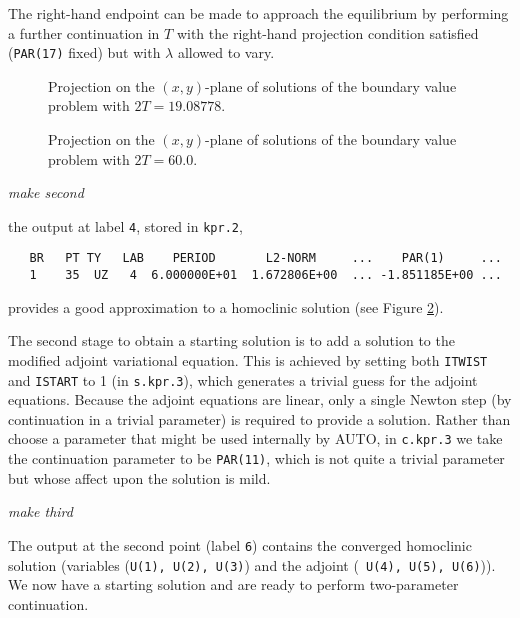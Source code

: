 \documentclass[12pt]{report}
\begin{document}
The right-hand endpoint can be made to approach the
equilibrium by performing a further continuation in $T$ with the
right-hand projection condition satisfied ({\tt PAR(17)} fixed) but
with $\lambda$ allowed to vary. 
%
\begin{figure}[p]
\epsfysize 9.0cm
\centerline{}
\caption{Projection on the $(x,y)$-plane of solutions 
of the boundary value 
problem with $2T=19.08778$.}
\label{kf.1a}
\end{figure}
\begin{figure}[p]
\epsfysize 9.0cm
\centerline{}
\caption{Projection on the $(x,y)$-plane of solutions of the 
boundary value problem with $2T = 60.0$.}
\label{kf.1b}
\end{figure}
%
\begin{center}
{\it make second}
\end{center}
the output at label {\tt 4}, stored in {\tt kpr.2},
\begin{verbatim}
   BR   PT TY   LAB    PERIOD       L2-NORM     ...    PAR(1)     ...
   1    35  UZ   4  6.000000E+01  1.672806E+00  ... -1.851185E+00 ...
\end{verbatim}
provides a good approximation to a homoclinic solution (see Figure
\ref{kf.1b}). 

The second stage to obtain a starting solution 
is to add a solution to the modified adjoint
variational equation. This is achieved by setting both 
{\tt ITWIST} and {\tt ISTART} to 1 (in {\tt s.kpr.3}), which generates
a trivial guess for the adjoint equations. Because the adjoint
equations are linear, only a single
Newton step (by continuation in a trivial parameter) 
is required to provide a solution.
Rather than choose a parameter that might be used internally
by {\cal AUTO}, in {\tt c.kpr.3} we take the continuation parameter
to be {\tt PAR(11)}, which is not quite a trivial parameter
but whose affect upon the solution is mild.
\begin{center}
{\it make third}
\end{center}
The output at the second point (label {\tt 6}) 
contains the converged homoclinic
solution (variables ({\tt U(1), U(2), U(3)}) and the adjoint ({\tt
U(4), U(5), U(6)})). We now have a starting solution 
and are ready to perform two-parameter continuation.
\end{document}
